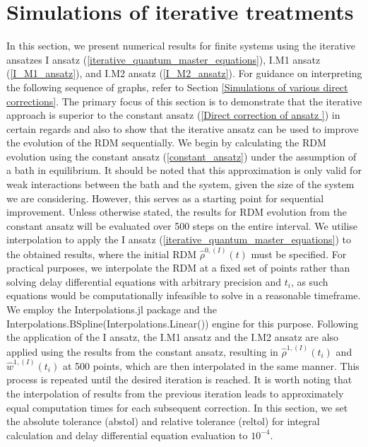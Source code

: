 \section{Simulations of iterative treatments}
\label{Simulations of iterative treatments}
In this section, we present numerical results for finite systems using the iterative ansatzes I ansatz (\ref{iterative_quantum_master_equations}), I.M1 ansatz (\ref{I_M1_ansatz}), and I.M2 ansatz (\ref{I_M2_ansatz}). For guidance on interpreting the following sequence of graphs, refer to Section \ref{Simulations of various direct corrections}. The primary focus of this section is to demonstrate that the iterative approach is superior to the constant ansatz (\ref{Direct correction of ansatz }) in certain regards and also to show that the iterative ansatz can be used to improve the evolution of the RDM sequentially. We begin by calculating the RDM evolution using the constant ansatz (\ref{constant_ansatz}) under the assumption of a bath in equilibrium. It should be noted that this approximation is only valid for weak interactions between the bath and the system, given the size of the system we are considering. However, this serves as a starting point for sequential improvement. Unless otherwise stated, the results for RDM evolution from the constant ansatz will be evaluated over 500 steps on the entire interval. We utilise interpolation to apply the I ansatz (\ref{iterative_quantum_master_equations}) to the obtained results, where the initial RDM $\hat{\rho}^{0,(I)}(t)$ must be specified. For practical purposes, we interpolate the RDM at a fixed set of points rather than solving delay differential equations with arbitrary precision and $t_i$, as such equations would be computationally infeasible to solve in a reasonable timeframe. We employ the Interpolations.jl package and the Interpolations.BSpline(Interpolations.Linear()) engine for this purpose. Following the application of the I ansatz, the I.M1 ansatz and the I.M2 ansatz are also applied using the results from the constant ansatz, resulting in $\hat{\rho}^{1,(I)}(t_i)$ and $\hat{w}^{1,(I)}(t_i)$ at 500 points, which are then interpolated in the same manner. This process is repeated until the desired iteration is reached. It is worth noting that the interpolation of results from the previous iteration leads to approximately equal computation times for each subsequent correction. In this section, we set the absolute tolerance (abstol) and relative tolerance (reltol) for integral calculation and delay differential equation evaluation to $10^{-4}$. 


